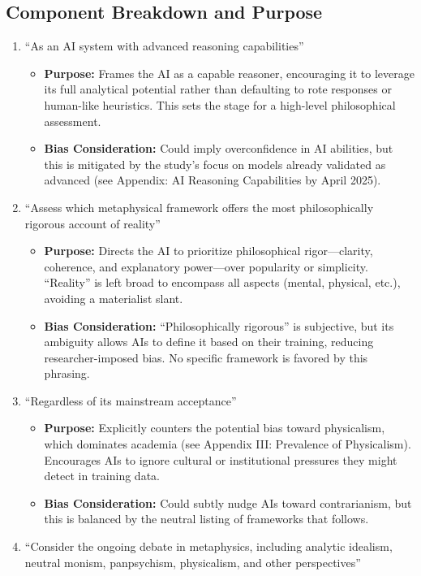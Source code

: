 \documentclass[11pt]{article}
\begin{document}
\subsection{Component Breakdown and Purpose}
\begin{enumerate}
  \item ``As an AI system with advanced reasoning capabilities''
    \begin{itemize}
      \item \textbf{Purpose:} Frames the AI as a capable reasoner, encouraging it to leverage its full analytical potential rather than defaulting to rote responses or human-like heuristics. This sets the stage for a high-level philosophical assessment.
      \item \textbf{Bias Consideration:} Could imply overconfidence in AI abilities, but this is mitigated by the study’s focus on models already validated as advanced (see Appendix: AI Reasoning Capabilities by April 2025).
    \end{itemize}
  \item ``Assess which metaphysical framework offers the most philosophically rigorous account of reality''
    \begin{itemize}
      \item \textbf{Purpose:} Directs the AI to prioritize philosophical rigor---clarity, coherence, and explanatory power---over popularity or simplicity. ``Reality'' is left broad to encompass all aspects (mental, physical, etc.), avoiding a materialist slant.
      \item \textbf{Bias Consideration:} ``Philosophically rigorous'' is subjective, but its ambiguity allows AIs to define it based on their training, reducing researcher-imposed bias. No specific framework is favored by this phrasing.
    \end{itemize}
  \item ``Regardless of its mainstream acceptance''
    \begin{itemize}
      \item \textbf{Purpose:} Explicitly counters the potential bias toward physicalism, which dominates academia (see Appendix III: Prevalence of Physicalism). Encourages AIs to ignore cultural or institutional pressures they might detect in training data.
      \item \textbf{Bias Consideration:} Could subtly nudge AIs toward contrarianism, but this is balanced by the neutral listing of frameworks that follows.
    \end{itemize}
  \item ``Consider the ongoing debate in metaphysics, including analytic idealism, neutral monism, panpsychism, physicalism, and other perspectives''

\end{enumerate}
\end{document}
